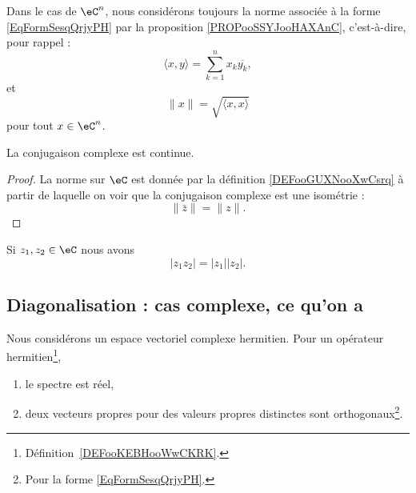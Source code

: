\begin{definition}      \label{DEFooGUXNooXwCsrq}
	Dans le cas de \( \eC^n\), nous considérons toujours la norme associée à la forme \eqref{EqFormSesqQrjyPH} par la proposition \ref{PROPooSSYJooHAXAnC}, c'est-à-dire, pour rappel :
	\begin{equation}		\label{EQooRRVCooVmcRrp}
		\langle x, y\rangle =\sum_{k=1}^nx_k\overline {y_k},
	\end{equation}
	et
	\begin{equation}
		\| x \|=  \sqrt{ \langle x, x\rangle }
	\end{equation}
	pour tout \( x\in \eC^n\).
\end{definition}


\begin{lemma}	\label{LEMooSYTWooMDzrnX}
	La conjugaison complexe est continue.
\end{lemma}

\begin{proof}
	La norme sur \( \eC\) est donnée par la définition \ref{DEFooGUXNooXwCsrq} à partir de laquelle on voir que la conjugaison complexe est une isométrie :
	\begin{equation}
		\| \bar z \|=\| z \|.
	\end{equation}
\end{proof}

\begin{lemma}	\label{LEMooGEVOooKeVQbb}
	Si \( z_1,z_2\in \eC\) nous avons
	\begin{equation}
		| z_1z_2 |=| z_1 || z_2 |.
	\end{equation}
\end{lemma}


\subsection{Diagonalisation : cas complexe, ce qu'on a}

\begin{lemma}      \label{LEMooVCEOooIXnTpp}
	Nous considérons un espace vectoriel complexe hermitien. Pour un opérateur hermitien\footnote{Définition~\ref{DEFooKEBHooWwCKRK}.},
	\begin{enumerate}
		\item
		      le spectre est réel,
		\item
		      deux vecteurs propres pour des valeurs propres distinctes sont orthogonaux\footnote{Pour la forme \eqref{EqFormSesqQrjyPH}.}.
	\end{enumerate}
\end{lemma}

